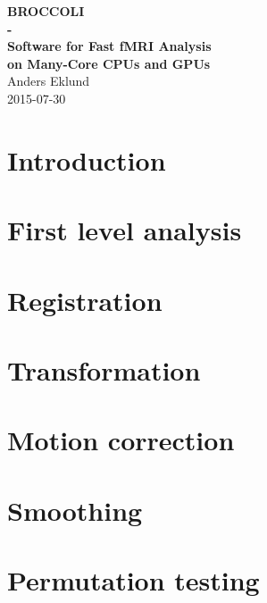 \documentclass[11pt,a4paper]{book}
\makeatletter
\def\cleardoublepage{\clearpage\if@twoside \ifodd\c@page\else
\hbox{}
\thispagestyle{empty}     
\newpage 
\if@twocolumn\hbox{}\newpage\fi\fi\fi}
\makeatother
\begin{document}



\thispagestyle{empty}
\makeatletter
\begin{center}
  {\huge \textbf{BROCCOLI \\ - \\ Software for Fast fMRI Analysis \\ on Many-Core CPUs and GPUs}}\\[1 cm]
  {\Large Anders Eklund}\\[1.5 cm]
  {\Large 2015-07-30}\\[1.5 cm]
\end{center}


\renewcommand{\contentsname}{Table of Contents}
\tableofcontents



%


\chapter{Introduction}
\label{sec:intro}


\cleardoublepage
\newpage
\chapter{First level analysis}
\label{sec:firstlevel}


\cleardoublepage
\newpage
\chapter{Registration}
\label{sec:registration}


\cleardoublepage
\newpage
\chapter{Transformation}
\label{sec:transformation}


\cleardoublepage
\newpage
\chapter{Motion correction}
\label{sec:motion}


\cleardoublepage
\newpage
\chapter{Smoothing}
\label{sec:smoothing}


\cleardoublepage
\newpage
\chapter{Permutation testing}
\label{sec:randomise}





\cleardoublepage
\end{document}
